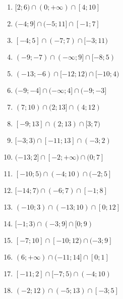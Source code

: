 \documentclass[12pt,a4paper]{article}
\begin{document}
\begin{ex}
\begin{enumerate}
		\item $[2;6)\cap(0;+ \infty)\cap[4;10]$
		\item $(-4;9]\cap(-5;11]\cap[-1;7]$
		\item $[-4;5]\cap(-7;7)\cap[-3;11)$
		\item $(-9;-7)\cap(-\infty;9]\cap[-8;5)$
		\item $(-13;-6)\cap[-12;12)\cap[-10;4)$
		\item $(-9;-4]\cap(-\infty;4]\cap(-9;-3]$
		\item $(7;10)\cap(2;13]\cap(4;12)$
		\item $[-9;13]\cap(2;13)\cap[3;7)$
		\item $[-3;3)\cap[-11;13]\cap(-3;2)$
		\item $(-13;2]\cap[-2;+ \infty)\cap(0;7]$
		\item $[-10;5)\cap(-4;10)\cap(-2;5]$
		\item $[-14;7)\cap(-6;7)\cap[-1;8]$
		\item $(-10;3)\cap(-13;10)\cap[0;12]$
		\item $[-1;3)\cap(-3;9]\cap[0;9)$
		\item $[-7;10]\cap[-10;12)\cap(-3;9]$
		\item $(6;+ \infty)\cap(-11;14]\cap[0;1]$
		\item $[-11;2]\cap[-7;5)\cap(-4;10)$
		\item $(-2;12)\cap(-5;13)\cap[-3;5]$
	\end{enumerate}
\end{ex}

	
	
	
	
	
	
\end{document}
